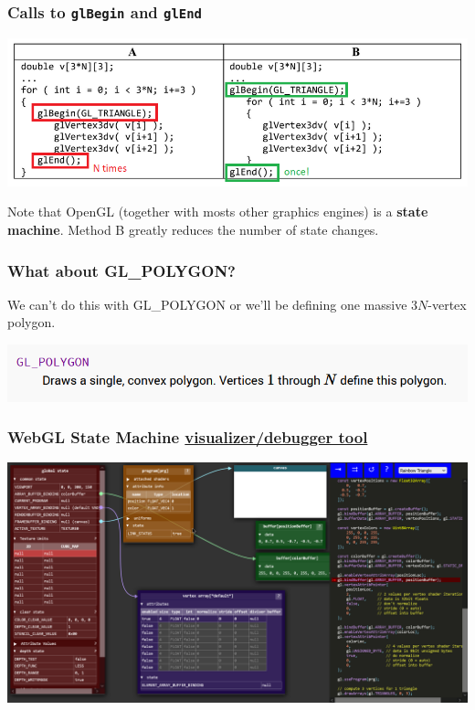 \documentclass{beamer}
\begin{document}
\begin{frame}
    \frametitle{Calls to \texttt{glBegin} and \texttt{glEnd}}

    \begin{center}
        \includegraphics[scale=0.6]{q7-annot.png}
    \end{center}

    Note that OpenGL (together with mosts other graphics engines)
    is a \textbf{state machine}. Method B greatly reduces the number of state changes.

\end{frame}

\begin{frame}
    \frametitle{What about GL\_POLYGON?}

    We can't do this with GL\_POLYGON or we'll be defining one massive
    $3N$-vertex polygon.

    \begin{center}
        \includegraphics[scale=0.6]{gl-polygon.png}
    \end{center}

\end{frame}

\begin{frame}
    \frametitle{WebGL State Machine \href{https://webglfundamentals.org/webgl/lessons/resources/webgl-state-diagram.html}{visualizer/debugger tool}}

    \begin{center}
        \includegraphics[scale=0.28]{webgl-fsm.png}
    \end{center}

\end{frame}
\end{document}
